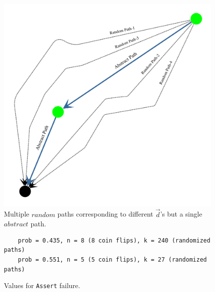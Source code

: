 \documentclass[usenames,dvipsnames,acmsmall]{acmart}
\begin{document}
\begin{figure}
	\centering
	\includegraphics[scale=0.16]{abstract.pdf}
	\caption{Multiple $random$ paths corresponding to different $\vec{d}$'s but a single $abstract$ path.}
\end{figure}

\begin{figure}
	\begin{verbatim}
	prob = 0.435, n = 8 (8 coin flips), k = 240 (randomized paths)
	prob = 0.551, n = 5 (5 coin flips), k = 27 (randomized paths) 
	\end{verbatim}
	\caption{Values for \texttt{Assert} failure.}
\end{figure}
\end{document}
